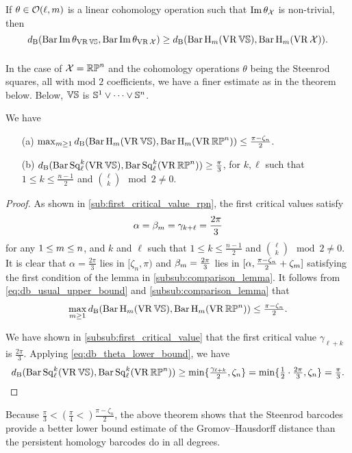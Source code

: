 \medskip\proposition

If $\theta \in \cO(\ell, \degp)$ is a linear cohomology operation such that $\img \theta_\cX$ is non-trivial, then
\[\db(\thetabarc{\VS}, \thetabarc{\cX}) \geq \db(\Hbarc[\field]{\degp}{\VS}, \Hbarc[\field]{\degp}{\cX}).\]

\subsubsection{}

In the case of $\cX = \rp^n$ and the cohomology operations $\theta$ being the Steenrod squares, all with mod $2$ coefficients, we have a finer estimate as in the theorem below.
Below, $\VS$ is $\bS^1\vee\dots\vee \bS^n$.

\medskip\theorem
We have
\begin{itemize} 
	\item[(a)] $\max_{\degp\geq 1}\db(\Hbarc{\degp}{\VS}, \Hbarc{\degp}{\rp^n})\leq \tfrac{\pi - \zeta_n}{2}$.
	\smallskip\item[(b)] $\db(\sqbarcl{k}{\ell}{\VS}, \sqbarcl{k}{\ell}{\rp^n})\geq \tfrac{\pi}{3}$, for $k,\ell$ such that $1\leq k \leq \frac{n-1}{2}$ and $\binom{\ell}{k} \mod 2 \neq 0$.
\end{itemize}

\begin{proof}
        As shown in \cref{sub:first_critical_value_rpn}, the first critical values satisfy
        $$
        \alpha = \beta_\degp = \gamma_{k+\ell} = \frac{2\pi}{3}
        $$
        for any $1 \leq \degp \leq n$, and $k$ and $\ell$ such that $1\leq k \leq \frac{n-1}{2}$ and $\binom{\ell}{k} \mod 2 \neq 0$.
        It is clear that $\alpha= \tfrac{2\pi}{3}$ lies in $[\zeta_n, \pi)$ and $\beta_\degp = \tfrac{2\pi}{3}$ lies in $[\alpha, \tfrac{\pi - \zeta_n}{2}+\zeta_\degp]$ satisfying the first condition of the lemma in \cref{subsub:comparison_lemma}. 
        It follows from \cref{eq:db_usual_upper_bound} and \cref{subsub:comparison_lemma} that
        \[\max_{\degp\geq 1}\db(\Hbarc{\degp}{\VS}, \Hbarc{\degp}{\rp^n})\leq \tfrac{\pi - \zeta_n}{2}.\]

        We have shown in \cref{subsub:first_critical_value} that the first critical value $\gamma_{\ell+k}$ is $\tfrac{2\pi}{3}$. 
        Applying \cref{eq:db_theta_lower_bound}, we have
        \[\db(\sqbarcl{k}{\ell}{\VS}, \sqbarcl{k}{\ell}{\rp^n}) 
        \geq \min\{\tfrac{\gamma_{\ell+k}}{2}, \zeta_n\} 
        = \min\{\tfrac{1}{2}\cdot\tfrac{2\pi}{3}, \zeta_n\} 
        = \tfrac{\pi}{3}.\]
\end{proof}

Because $\tfrac{\pi}{3} < (\tfrac{\pi}{4} <) \tfrac{\pi - \zeta_n}{2}$, the above theorem shows that the Steenrod barcodes provide a better lower bound estimate of the Gromov--Hausdorff distance than the persistent homology barcodes do in all degrees.

